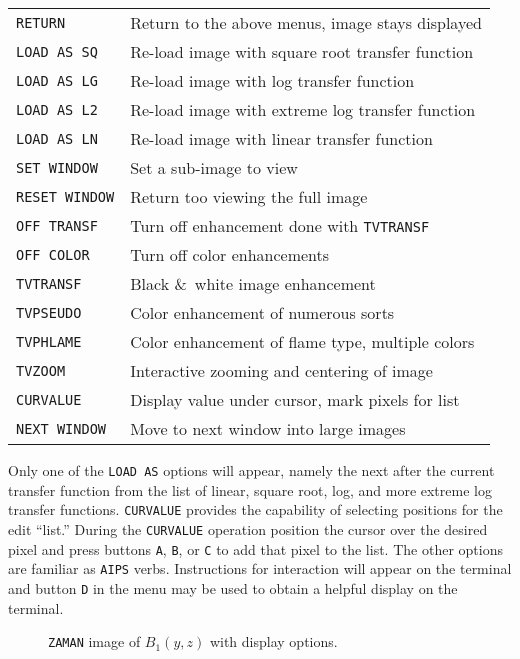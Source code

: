 \documentclass[twoside]{article}
\newcommand{\putfig}[1]{\texttt{[image: \#1.eps]}}
\begin{document}
\begin{center}
\begin{tabular}{|l|l|}\hline
 {\tt RETURN     } & Return to the above menus, image stays displayed\\
 {\tt LOAD AS SQ } & Re-load image with square root transfer function\\
 {\tt LOAD AS LG } & Re-load image with log transfer function\\
 {\tt LOAD AS L2 } & Re-load image with extreme log transfer function\\
 {\tt LOAD AS LN } & Re-load image with linear transfer function\\
 {\tt SET WINDOW } & Set a sub-image to view\\
 {\tt RESET WINDOW} & Return too viewing the full image\\
 {\tt OFF TRANSF } & Turn off enhancement done with {\tt TVTRANSF}\\
 {\tt OFF COLOR  } & Turn off color enhancements\\
 {\tt TVTRANSF   } & Black \&\ white image enhancement\\
 {\tt TVPSEUDO   } & Color enhancement of numerous sorts\\
 {\tt TVPHLAME   } & Color enhancement of flame type, multiple colors\\
 {\tt TVZOOM     } & Interactive zooming and centering of image\\
 {\tt CURVALUE   } & Display value under cursor, mark pixels for list\\
 {\tt NEXT WINDOW} & Move to next window into large images\\ \hline
\end{tabular}
\end{center}
Only one of the {\tt LOAD AS} options will appear, namely the next
after the current transfer function from the list of linear, square
root, log, and more extreme log transfer functions.  {\tt CURVALUE}
provides the capability of selecting positions for the edit ``list.''
During the {\tt CURVALUE} operation position the cursor over the
desired pixel and press buttons {\tt A}, {\tt B}, or {\tt C} to add
that pixel to the list.  The other options are familiar as {\tt AIPS}
verbs.  Instructions for interaction will appear on the terminal and
button {\tt D} in the menu may be used to obtain a helpful display on
the terminal.

\begin{figure}
\begin{center}
\resizebox{6.0in}{!}{\putfig{ZAMAN.field1}}
\caption{{\tt ZAMAN} image of $B_1(y,z)$ with display options.}
\label{fig:ZAMAN.field1}
\end{center}
\end{figure}
\end{document}
